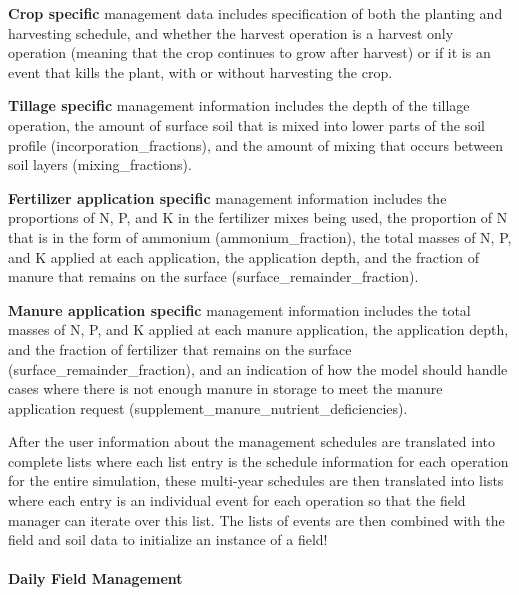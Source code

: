 \textbf{Crop specific} management data includes specification of both the planting and harvesting schedule, and whether the harvest operation is a harvest only operation (meaning that the crop continues to grow after harvest) or if it is an event that kills the plant, with or without harvesting the crop. 
\vspace{0.2cm}

\textbf{Tillage specific} management information includes the depth of the tillage operation, the amount of surface soil that is mixed into lower parts of the soil profile (incorporation\_fractions), and the amount of mixing that occurs between soil layers (mixing\_fractions). 
\vspace{0.2cm}

\textbf{Fertilizer application specific} management information includes the proportions of N, P, and K in the fertilizer mixes being used, the proportion of N that is in the form of ammonium (ammonium\_fraction), the total masses of N, P, and K applied at each application, the application depth, and the fraction of manure that remains on the surface (surface\_remainder\_fraction). 
\vspace{0.2cm}

\textbf{Manure application specific} management information includes the total masses of N, P, and K applied at each manure application, the application depth, and the fraction of fertilizer that remains on the surface (surface\_remainder\_fraction), and an indication of how the model should handle cases where there is not enough manure in storage to meet the manure application request (supplement\_manure\_nutrient\_deficiencies). 
\vspace{0.2cm}

After the user information about the management schedules are translated into complete lists where each list entry is the schedule information for each operation for the entire simulation, these multi-year schedules are then translated into lists where each entry is an individual event for each operation so that the field manager can iterate over this list. The lists of events are then combined with the field and soil data to initialize an instance of a field!

\paragraph{Daily Field Management}
\vspace{-0.25cm}

